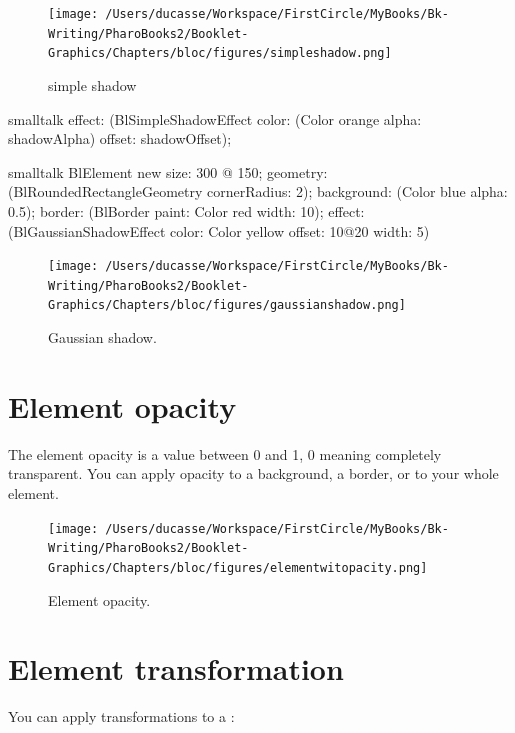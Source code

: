 \documentclass[10pt,twoside,english]{_support/latex/sbabook/sbabook}
\begin{document}
\begin{figure}[htpb]
\begin{center}
\texttt{[image: /Users/ducasse/Workspace/FirstCircle/MyBooks/Bk-Writing/PharoBooks2/Booklet-Graphics/Chapters/bloc/figures/simpleshadow.png]}
\caption{simple shadow}
\end{center}
\end{figure}

\begin{displaycode}{smalltalk}
effect: (BlSimpleShadowEffect
	color: (Color orange alpha: shadowAlpha)
	offset: shadowOffset);
\end{displaycode}
\begin{displaycode}{smalltalk}
BlElement new
        size: 300 @ 150;
        geometry: (BlRoundedRectangleGeometry cornerRadius: 2);
        background: (Color blue alpha: 0.5);
        border: (BlBorder paint: Color red width: 10);
        effect: (BlGaussianShadowEffect color: Color yellow offset: 10@20 width: 5)
\end{displaycode}

\begin{figure}[htpb]
\begin{center}
\texttt{[image: /Users/ducasse/Workspace/FirstCircle/MyBooks/Bk-Writing/PharoBooks2/Booklet-Graphics/Chapters/bloc/figures/gaussianshadow.png]}
\caption{Gaussian shadow.}
\end{center}
\end{figure}


\section{Element opacity}
The element opacity is a value between 0 and 1, 0 meaning completely transparent.
You can apply opacity to a background, a border, or to your whole element.

\begin{figure}[htpb]
\begin{center}
\texttt{[image: /Users/ducasse/Workspace/FirstCircle/MyBooks/Bk-Writing/PharoBooks2/Booklet-Graphics/Chapters/bloc/figures/elementwitopacity.png]}
\caption{Element opacity.}
\end{center}
\end{figure}


\section{Element transformation}
You can apply transformations to a :
\end{document}
